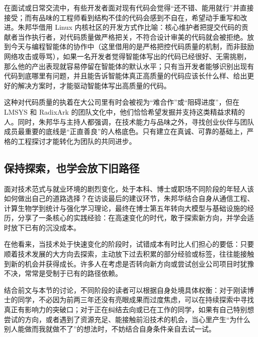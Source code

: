 \documentclass[UTF8,a4paper,11pt,fontset=fandol]{ctexart}
\begin{document}
在面试或日常交流中，有些开发者面对现有代码会觉得“还不错、能用就行”并直接接受；而有品味的工程师看到结构不佳的代码会感到不自在，希望动手重写和改进。朱邦华借用 Linux 内核社区的开发方式作比喻：核心维护者把提交代码的贡献者当作执行者，对代码质量做严格把关，不符合设计审美的代码就会被拒绝。放到今天与编程智能体的协作中（这里借用的是严格把控代码质量的机制，而非鼓励网络攻击或辱骂），如果一名开发者觉得智能体写出的代码已经很好、无需挑剔，那么他的产出表现就容易停留在智能体的默认水平；只有当开发者能够识别出现有代码到底哪里有问题，并且能告诉智能体真正高质量的代码应该长什么样、给出更好的解决方案时，才能驱动智能体写出高质量的代码。

这种对代码质量的执着在大公司里有时会被视为“难合作”或“阻碍进度”，但在 LMSYS 和 RadixArk 的团队文化中，他们恰恰希望发掘并支持这类精益求精的人。同时，朱邦华与主持人都强调，在技术能力与品味之外，寻找创业伙伴与团队成员最重要的底线是“正直善良”的人格底色。只有建立在真诚、可靠的基础上，严格的工程探讨才能转化为团队的共同进步。

\subsection{保持探索，也学会放下旧路径}
面对技术范式与就业环境的剧烈变化，处于本科、博士或职场不同阶段的年轻人该如何做出自己的道路选择？在访谈最后的建议环节，朱邦华结合自身从通信工程、计算生物学到统计与强化学习理论，最终在博士第五年转向大模型与基础设施的经历，分享了一条核心的实践经验：在高速变化的时代，敢于探索新方向，并学会适时放下已有的沉没成本。

在他看来，当技术处于快速变化的阶段时，试错成本有时比人们担心的要低：只要顺着技术发展的大方向去探索，主动放下过去积累的部分经验或标签，往往能接触到新的机会并获得成长。许多人在考虑是否转向新方向或尝试创业公司项目时犹豫不决，常常是受制于已有的路径依赖。

结合前文与本节的讨论，不同阶段的读者可以根据自身处境具体权衡：对于刚读博士的同学，不必因为前两三年还没有亮眼成果而过度焦虑，可以在持续探索中寻找真正有影响力的突破口；对于正在纠结去向或已在工作的同学，如果有自己特别想尝试的方向，或者遇到了资源充足、能接触前沿技术的机会，当心里产生“为什么别人能做而我就做不了”的想法时，不妨结合自身条件亲自去试一试。
\end{document}
